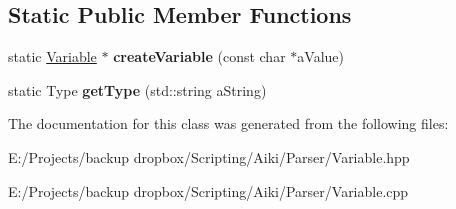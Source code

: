 \subsection*{Static Public Member Functions}
\begin{DoxyCompactItemize}
\item 
\hypertarget{a00027_a6f6b6ddbc721a4a702473a145e862a1b}{static \hyperlink{a00027}{Variable} $\ast$ {\bfseries create\+Variable} (const char $\ast$a\+Value)}\label{a00027_a6f6b6ddbc721a4a702473a145e862a1b}

\item 
\hypertarget{a00027_a0c78560da5419d9096e09dd562932735}{static Type {\bfseries get\+Type} (std\+::string a\+String)}\label{a00027_a0c78560da5419d9096e09dd562932735}

\end{DoxyCompactItemize}


The documentation for this class was generated from the following files\+:\begin{DoxyCompactItemize}
\item 
E\+:/\+Projects/backup dropbox/\+Scripting/\+Aiki/\+Parser/Variable.\+hpp\item 
E\+:/\+Projects/backup dropbox/\+Scripting/\+Aiki/\+Parser/Variable.\+cpp\end{DoxyCompactItemize}
